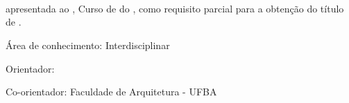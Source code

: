 \begin{folharosto}

\begin{center}
\theauthor
\end{center}
\ \\
\ \\
\ \\
\ \\
\ \\
\begin{spacing}{2}
   \begin{center}
   {\LARGE {\bf \thetitle}}
   \end{center}
\end{spacing}
\ \\
\ \\
\ \\
\begin{flushright}

   \begin{list}{}{
      \setlength{\leftmargin}{4.5cm}
      \setlength{\rightmargin}{0cm}
      \setlength{\labelwidth}{0pt}
      \setlength{\labelsep}{\leftmargin}}

      \item \thetypework apresentada ao \thefaculty, Curso de \thecourse
      do \theuniversity, como requisito parcial para a obten\c{c}\~ao do
      t\'itulo de {\bf \thedegreetitle}.

      \begin{list}{}{
      \setlength{\leftmargin}{0cm}
      \setlength{\rightmargin}{0cm}
      \setlength{\labelwidth}{0pt}
      \setlength{\labelsep}{\leftmargin}}

      \item \'Area de conhecimento: Interdisciplinar

      \item Orientador: \theadvisor
      \newline \hspace*{2.1cm}  {\it \theuniversity}

      \item Co-orientador: \thecoadvisor
      \newline \hspace*{2.1cm}  {Faculdade de Arquitetura - UFBA} %


\end{list}
\end{list}
\end{flushright}
\end{folharosto}
